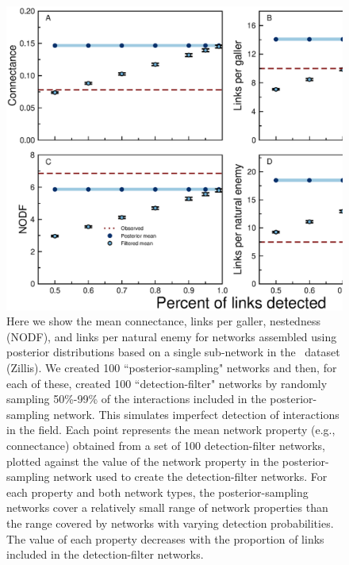 \documentclass[12pt]{article}
\begin{document}
  \begin{figure}[h!]
    \caption{Here we show the mean connectance, links per galler, nestedness (NODF), and links per natural enemy for networks assembled using posterior distributions based on a single sub-network in the~\citet{Kopelke2017} dataset (Zillis). We created 100 ``posterior-sampling" networks and then, for each of these, created 100 ``detection-filter" networks by randomly sampling 50\%-99\% of the interactions included in the posterior-sampling network. This simulates imperfect detection of interactions in the field. Each point represents the mean network property (e.g., connectance) obtained from a set of 100 detection-filter networks, plotted against the value of the network property in the posterior-sampling network used to create the detection-filter networks. For each property and both network types, the posterior-sampling networks cover a relatively small range of network properties than the range covered by networks with varying detection probabilities. The value of each property decreases with the proportion of links included in the detection-filter networks.}
    \label{posterior_webs}    
    \begin{center}
    \includegraphics[width=.8\textwidth]{figures/GP_posterior_properties_Zillis.eps}
    \end{center}
    \end{figure}


\clearpage

     
\end{document}
